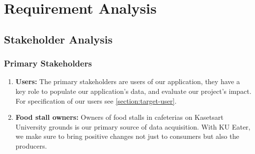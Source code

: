 
\newcommand{\userstory}[4]{%
    \refstepcounter{nuserstory}
    \subsection{#1}
    \label{userstory:\thenuserstory}
    \hangindent=40pt
    \textbf{\textit{As a}} #2,\\
    \textbf{\textit{I want to}} #3,\\
    \textbf{\textit{so that}} #4.
}
\newenvironment{usecase}[1]
{
    \refstepcounter{nusecase}%
    \subsection{Use Case \thenusecase: #1}%
    \label{usecase:\thenusecase}%
}{}


\chapter{Requirement Analysis}
\label{chap:requirement-analysis}

\section{Stakeholder Analysis}
\label{section:stakeholder-analysis}

\subsection{Primary Stakeholders}
\label{subsection:primary-stakeholders}

\begin{enumerate}[leftmargin=80pt]
    \item \textbf{Users:} The primary stakeholders are users of our application,
    they have a key role to populate our application's data, and evaluate our project's impact.
    For specification of our users see \ref{section:target-user}.
    \item \textbf{Food stall owners:} Owners of food stalls in cafeterias on Kasetsart University grounds
    is our primary source of data acquisition. With KU Eater, we make sure to bring positive changes not just to
    consumers but also the producers.
\end{enumerate}

